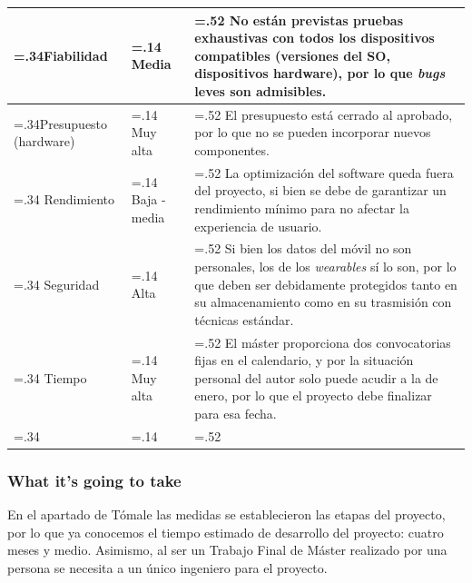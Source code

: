 \begin{tabularx}{\textwidth}{ | >{\hsize=.34\hsize}X | >{\hsize=.14\hsize}X | >{\hsize=.52\hsize} X | }
                    \hline
                        Fiabilidad 
                        & 
                        Media  
                        & 
                        No están previstas pruebas exhaustivas con todos los dispositivos compatibles (versiones del SO, dispositivos hardware), por lo que \textit{bugs} leves son admisibles. \\
                    \hline
                        Presupuesto (hardware) 
                        & 
                        Muy alta  
                        & 
                        El presupuesto está cerrado al aprobado, por lo que no se pueden incorporar nuevos componentes. \\
                    \hline
                        Rendimiento 
                        & 
                        Baja - media  
                        & 
                        La optimización del software queda fuera del proyecto, si bien se debe de garantizar un rendimiento mínimo para no afectar la experiencia de usuario. \\
                    \hline
                        Seguridad 
                        & 
                        Alta  
                        & 
                        Si bien los datos del móvil no son personales, los de los \textit{wearables} sí lo son, por lo que deben ser debidamente protegidos tanto en su almacenamiento como en su trasmisión con técnicas estándar. \\
                    \hline
                        Tiempo 
                        & 
                        Muy alta  
                        & 
                        El máster proporciona dos convocatorias fijas en el calendario, y por la situación personal del autor solo puede acudir a la de enero, por lo que el proyecto debe finalizar para esa fecha. \\
                    \hline
                    
                    \caption{Cuestiones y prioridades del proyecto}
                    \label{tab:dev:prioridades}
                \end{tabularx}
            
            
            \subsubsection{What it's going to take}
            
                En el apartado de Tómale las medidas se establecieron las etapas del proyecto, por lo que ya conocemos el tiempo estimado de desarrollo del proyecto: cuatro meses y medio. Asimismo, al ser un Trabajo Final de Máster realizado por una persona se necesita a un único ingeniero para el proyecto.
                
